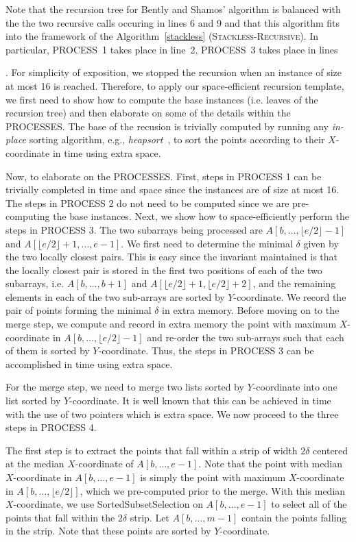 Note that the recursion tree for Bently and Shamos' algorithm is balanced
with the the two recursive calls occuring in lines 6 and 9 and that this
algorithm fits into the framework of the Algorithm~\ref{stackless}
(\textsc{Stackless-Recursive}).  In particular, PROCESS~1 takes place in
line~2, PROCESS~3 takes place in lines 


. For
simplicity of exposition, we stopped the recursion when an instance of size at
most 16 is reached.  Therefore, to apply our space-efficient recursion
template, we first need to show how to compute the base instances (i.e. leaves
of the recursion tree) and then elaborate on some of the details within the
PROCESSES.  The base of the recusion is trivially computed by running any
\emph{in-place} sorting algorithm, e.g., \emph{heapsort}~\cite{floyd:245}, to
sort the points according to their $X$-coordinate in  time using
 extra space.

Now, to elaborate on the PROCESSES. First, steps in PROCESS 1 can be trivially
completed in  time and space since the instances are of size at most 16.
The steps in PROCESS 2 do not need to be computed since we are pre-computing
the base instances.  Next, we show how to space-efficiently perform the steps
in PROCESS 3. The two subarrays being processed are $A[b,\ldots,\lfloor e/2
\rfloor-1]$ and $A[\lfloor e/2 \rfloor + 1,\ldots, e-1]$. We first need to
determine the minimal $\delta$ given by the two locally closest pairs. This is
easy since the invariant maintained is that the locally closest pair is stored
in the first two positions of each of the two subarrays, i.e.
$A[b,\ldots,b+1]$ and $A[\lfloor e/2 \rfloor + 1, \lfloor e/2 \rfloor + 2]$,
and the remaining elements in each of the two sub-arrays are sorted by
$Y$-coordinate. We record the pair of points forming the minimal $\delta$ in
extra memory. Before moving on to the merge step, we compute and record in
extra memory the point with maximum $X$-coordinate in $A[b,\ldots, \lfloor e/2
\rfloor-1]$ and re-order the two sub-arrays such that each of them is sorted
by $Y$-coordinate.  Thus, the steps in PROCESS 3 can be accomplished in 
time using  extra space.

For the merge step, we need to merge two lists sorted by $Y$-coordinate into
one list sorted by $Y$-coordinate. It is well known that this can be achieved
in  time with the use of two pointers which is  extra space.  We
now proceed to the three steps in PROCESS 4. 

The first step is to extract the points that
fall within a strip of width $2\delta$ centered at the median $X$-coordinate of $A[b,\ldots,e-1]$. 
Note that the point with median $X$-coordinate in $A[b,\ldots,e-1]$ is simply the point with 
maximum $X$-coordinate in $A[b,\ldots,\lfloor e/2 \rfloor]$, which we pre-computed prior to the merge.
With this median $X$-coordinate, we use SortedSubsetSelection on $A[b,\ldots,e-1]$
to select all of the points that fall within the $2\delta$ strip. Let $A[b,\ldots,m-1]$ contain the
points falling in the strip. Note that these points are sorted by $Y$-coordinate.

